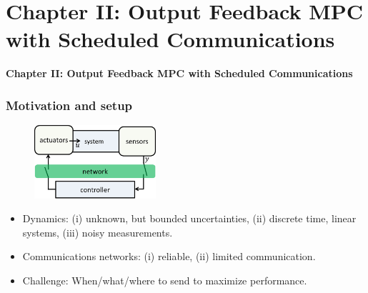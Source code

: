 \documentclass{beamer}
\begin{document}
\section{Chapter II: Output Feedback MPC with Scheduled Communications}
\begin{frame}
\centerline{\textbf{Chapter II: Output Feedback MPC with Scheduled Communications}
}
\end{frame}
\begin{frame}
 \frametitle{Motivation and setup}
 \begin{figure}
\centering
\includegraphics[width=0.4\textwidth ]{clc.png}
\end{figure}
 \begin{itemize}
  \item Dynamics: (i) unknown, but bounded uncertainties, (ii) discrete time, linear systems, (iii) noisy measurements.
  \item Communications networks: (i) reliable, (ii) limited communication. %
  \item Challenge: When/what/where to send to maximize  performance.
 \end{itemize}
\end{frame}
\end{document}
